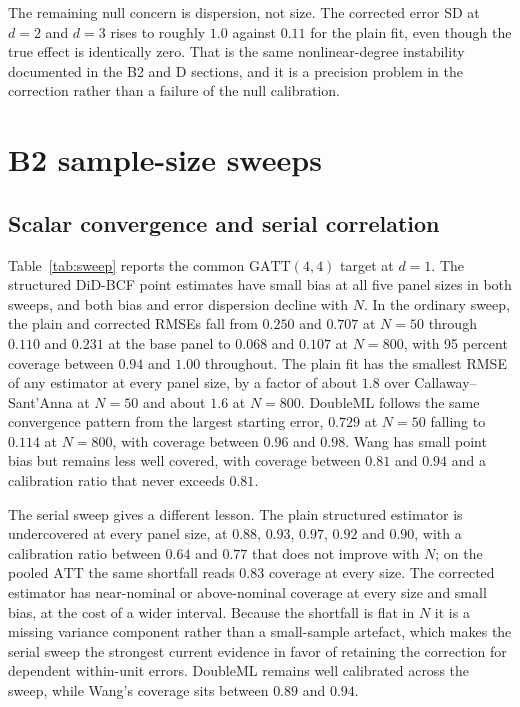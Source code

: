 \documentclass[11pt]{article}
\newcommand{\att}{\mathrm{ATT}}
\newcommand{\gatt}{\mathrm{GATT}}
\begin{document}
The remaining null concern is dispersion, not size. The corrected error SD at
$d=2$ and $d=3$ rises to roughly $1.0$ against $0.11$ for the plain fit, even
though the true effect is identically zero. That is the same nonlinear-degree
instability documented in the B2 and D sections, and it is a precision problem
in the correction rather than a failure of the null calibration.



\section{B2 sample-size sweeps}

\subsection{Scalar convergence and serial correlation}

Table~\ref{tab:sweep} reports the common $\gatt(4,4)$ target at $d=1$. The
structured DiD-BCF point estimates have small bias at all five panel sizes in
both sweeps, and both bias and error dispersion decline with $N$. In the
ordinary sweep, the plain and corrected RMSEs fall from $0.250$ and $0.707$ at
$N=50$ through $0.110$ and $0.231$ at the base panel to $0.068$ and $0.107$ at
$N=800$, with 95 percent coverage between $0.94$ and $1.00$ throughout. The
plain fit has the smallest RMSE of any estimator at every panel size, by a
factor of about $1.8$ over Callaway--Sant'Anna at $N=50$ and about $1.6$ at
$N=800$. DoubleML follows the same convergence pattern from the largest
starting error, $0.729$ at $N=50$ falling to $0.114$ at $N=800$, with coverage
between $0.96$ and $0.98$. Wang has small point bias but remains less well
covered, with coverage between $0.81$ and $0.94$ and a calibration ratio that
never exceeds $0.81$.

The serial sweep gives a different lesson. The plain structured estimator is
undercovered at every panel size, at $0.88$, $0.93$, $0.97$, $0.92$ and $0.90$,
with a calibration ratio between $0.64$ and $0.77$ that does not improve with
$N$; on the pooled $\att$ the same shortfall reads $0.83$ coverage at every
size. The corrected estimator has near-nominal or above-nominal coverage at
every size and small bias, at the cost of a wider interval. Because the
shortfall is flat in $N$ it is a missing variance component rather than a
small-sample artefact, which makes the serial sweep the strongest current
evidence in favor of retaining the correction for dependent within-unit errors.
DoubleML remains well calibrated across the sweep, while Wang's coverage sits
between $0.89$ and $0.94$.
\end{document}
